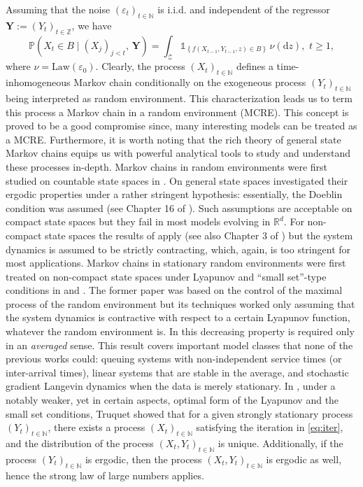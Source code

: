 \documentclass[a4paper,10pt]{article}
\newcommand{\N}{\mathbb{N}}
\newcommand{\Z}{\mathbb{Z}}
\newcommand{\R}{\mathbb{R}}
\renewcommand{\P}{\mathbb{P}}
\newcommand{\law}[1]{\text{Law}(#1)}
\newcommand{\ind}{\mathds{1}}
\newcommand{\eps}{\varepsilon}
\newcommand{\dint}{\mathrm{d}}  %
\begin{document}
\smallskip
Assuming that the noise $(\eps_t)_{t\in\N}$ is i.i.d. and independent of the regressor $\mathbf{Y}:=(Y_t)_{t\in\Z}$, we have
\begin{equation}\label{eq:iter_con_ex}
\P (X_{t}\in B\mid (X_j)_{j<t},\,\mathbf{Y}) = \int_{\mathcal{Z}} \ind_{\left\{f(X_{t-1},Y_{t-1},z)\in B\right\}}\,\nu (\dint z),\,\,t\ge 1,
\end{equation}
where $\nu = \law{\eps_0}$. Clearly, the process $(X_t)_{t\in\N}$ defines a time-inhomogeneous Markov chain conditionally on the exogeneous process $(Y_t)_{t\in\N}$ being interpreted as random environment. This characterization leads us to term this process a Markov chain in a random environment (MCRE). This concept is proved to be a good compromise since, many interesting models can be treated as a MCRE. Furthermore, it is worth noting that the rich theory of general state Markov chains equips us with powerful analytical tools to study and understand these processes in-depth. 
Markov chains in random environments were first studied on countable state spaces in
\cite{cogburn1984ergodic,cogburn1990direct,orey1991markov}. On general state spaces \cite{kifer1,kifer1998limit,seppalainen1994large} investigated their ergodic properties under a rather stringent hypothesis: essentially, the Doeblin condition was assumed (see Chapter 16 of \cite{mt}). Such assumptions are acceptable on compact state spaces but they fail in most models evolving in $\R^{d}$. For non-compact state spaces the results of \cite{stenflo} apply (see also Chapter 3 of \cite{borovkov}) but the system dynamics is assumed to be strictly contracting, which, again, is too stringent for most applications. Markov chains in stationary random environments were first treated on non-compact state spaces under Lyapunov and ``small set''-type conditions in \cite{rasonyi2018} and \cite{lovas}. The former paper was based on the control of the maximal process of the random environment but its techniques worked only assuming that the system dynamics is contractive with respect to a certain Lyapunov function, whatever the random environment is. In \cite{lovas} this decreasing property is required only in an \emph{averaged} sense. This result covers important model classes that none of the previous works could: queuing systems with non-independent service times (or inter-arrival times), linear systems that are stable in the average, and stochastic gradient Langevin dynamics when the data is merely stationary. 
In \cite{Truquet1}, under a notably weaker, yet in certain aspects, optimal form of the Lyapunov and the small set conditions, Truquet showed that for a given strongly stationary process $(Y_t)_{t\in\N}$, there exists a process $(X_t)_{t\in\N}$ satisfying the iteration in \eqref{eq:iter}, and the distribution of the process $(X_t,Y_t)_{t\in\N}$ is unique. Additionally, if the process $(Y_t)_{t\in\N}$ is ergodic, then the process $(X_t,Y_t)_{t\in\N}$ is ergodic as well, hence the strong law of large numbers applies.
\end{document}
